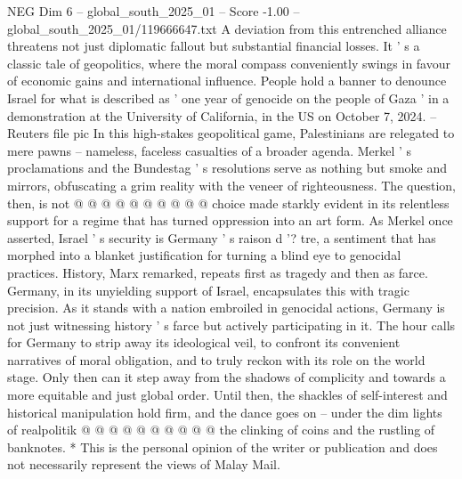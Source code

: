 \begin{textsample}{NEG Dim 6 – global\_south\_2025\_01 – Score -1.00 – global\_south\_2025\_01/119666647.txt}
A deviation from this entrenched alliance threatens not just diplomatic fallout but substantial financial losses.
It ' s a classic tale of geopolitics, where the moral compass conveniently swings in favour of economic gains and international influence.
People hold a banner to denounce Israel for what is described as ' one year of genocide on the people of Gaza ' in a demonstration at the University of California, in the US on October 7, 2024. -- Reuters file pic In this high-stakes geopolitical game, Palestinians are relegated to mere pawns -- nameless, faceless casualties of a broader agenda.
Merkel ' s proclamations and the Bundestag ' s resolutions serve as nothing but smoke and mirrors, obfuscating a grim reality with the veneer of righteousness.
The question, then, is not @ @ @ @ @ @ @ @ @ @ choice made starkly evident in its relentless support for a regime that has turned oppression into an art form.
As Merkel once asserted, Israel ' s security is Germany ' s raison d '? tre, a sentiment that has morphed into a blanket justification for turning a blind eye to genocidal practices.
History, Marx remarked, repeats first as tragedy and then as farce.
Germany, in its unyielding support of Israel, encapsulates this with tragic precision.
As it stands with a nation embroiled in genocidal actions, Germany is not just witnessing history ' s farce but actively participating in it.
The hour calls for Germany to strip away its ideological veil, to confront its convenient narratives of moral obligation, and to truly reckon with its role on the world stage.
Only then can it step away from the shadows of complicity and towards a more equitable and just global order.
Until then, the shackles of self-interest and historical manipulation hold firm, and the dance goes on -- under the dim lights of realpolitik @ @ @ @ @ @ @ @ @ @ the clinking of coins and the rustling of banknotes. * This is the personal opinion of the writer or publication and does not necessarily represent the views of Malay Mail.

\end{textsample}
